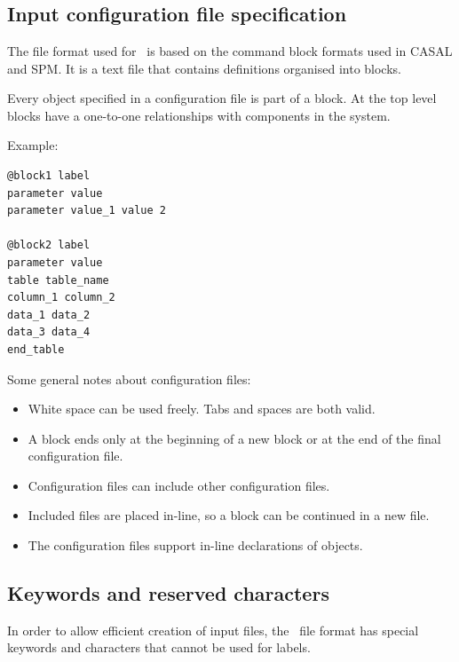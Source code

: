 
\section{\label{sec:examples}}

\subsection{Input configuration file specification}

The file format used for \CNAME\ is based on the command block formats used in CASAL and SPM. It is a text file that contains definitions organised into blocks.

Every object specified in a configuration file is part of a block. At the top level blocks have a one-to-one relationships with components in the system.

Example:

{\small{\begin{verbatim}
@block1 label
parameter value
parameter value_1 value 2

@block2 label
parameter value
table table_name
column_1 column_2
data_1 data_2
data_3 data_4
end_table
\end{verbatim}}}

Some general notes about configuration files:

\begin{itemize}
	\item White space can be used freely. Tabs and spaces are both valid.
	\item A block ends only at the beginning of a new block or at the end of the final configuration file.
	\item Configuration files can include other configuration files.
	\item Included files are placed in-line, so a block can be continued in a new file.
	\item The configuration files support in-line declarations of objects.
\end{itemize}

\subsection{Keywords and reserved characters}

In order to allow efficient creation of input files, the \CNAME\ file format has special keywords and characters that cannot be used for labels.

